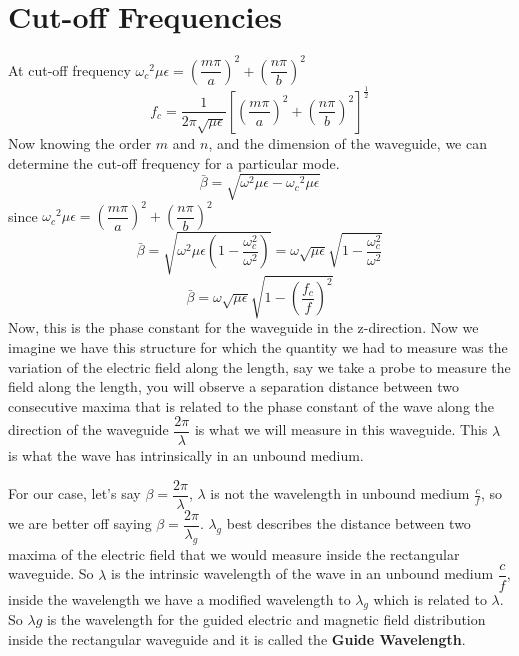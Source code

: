 \section{Cut-off Frequencies}
At cut-off frequency ${\omega_c}^2\mu\epsilon = \left(\dfrac{m\pi}{a}\right)^2 + \left(\dfrac{n\pi}{b}\right)^2$
\begin{dmath}
f_c = \frac{1}{2\pi \sqrt{\mu\epsilon}}\left[\left(\frac{m\pi}{a}\right)^2 + \left(\dfrac{n\pi}{b}\right)^2\right]^{\frac{1}{2}}
\label{eqn:cut-off}
\end{dmath}
Now knowing the order $m$ and $n$, and the dimension of the waveguide, we can determine the cut-off frequency for a particular mode.
\begin{dmath*}
\bar{\beta} = \sqrt{{\omega}^2\mu\epsilon-{\omega_c}^2\mu\epsilon}
\end{dmath*}
since ${\omega_c}^2\mu\epsilon = \left(\dfrac{m\pi}{a}\right)^2 + \left(\dfrac{n\pi}{b}\right)^2$
\begin{dmath*}
\bar{\beta} = \sqrt{\omega^2\mu\epsilon\left(1 - \frac{\omega_c^2}{\omega^2}\right)}
= \omega\sqrt{\mu\epsilon}\sqrt{1 - \frac{\omega_c^2}{\omega^2}}
\end{dmath*}
\begin{dmath*}
\bar{\beta} = \omega\sqrt{\mu\epsilon}\sqrt{1 - \left(\frac{f_c}{f}\right)^2}
\label{eqn:phaseconstrec}
\end{dmath*}
Now, this is the phase constant for the waveguide in the z-direction. Now we imagine we have this structure for which the quantity we had to measure was the variation of the electric field along the length, say we take a probe to measure the field along the length, you will observe a separation distance between two consecutive maxima that is related to the phase constant of the wave along the direction of the waveguide $\dfrac{2\pi}{\lambda}$ is what we will measure in this waveguide. This $\lambda$ is what the wave has intrinsically in an unbound medium.

For our case, let's say $\beta = \dfrac{2\pi}{\lambda}$, $\lambda$ is not the wavelength in unbound medium $\frac{c}{f}$, so we are better off saying  $\beta = \dfrac{2\pi}{\lambda_g}$. ${\lambda_g}$ best describes the distance between two maxima of the electric field that we would measure inside the rectangular waveguide. So $\lambda$ is the intrinsic wavelength of the wave in an unbound medium $\dfrac{c}{f}$, inside the wavelength we have a modified wavelength to $\lambda_g$ which is related to $\lambda$. So $\lambda g$ is the wavelength for the guided electric and magnetic field distribution inside the rectangular waveguide and it is called the \textbf{Guide Wavelength}. 

